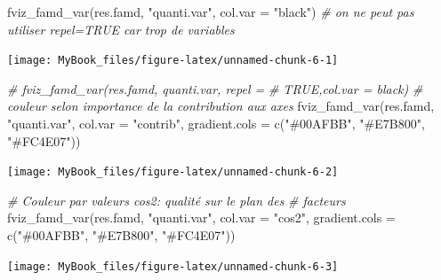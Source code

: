 \documentclass[
  12pt,
  american,
  a4paper,
  extrafontsizes,onecolumn,openright
  ]{memoir}
\newenvironment{Shaded}{\begin{snugshade}}{\end{snugshade}}
\newcommand{\AttributeTok}[1]{\textcolor[rgb]{0.77,0.63,0.00}{#1}}
\newcommand{\CommentTok}[1]{\textcolor[rgb]{0.56,0.35,0.01}{\textit{#1}}}
\newcommand{\FunctionTok}[1]{\textcolor[rgb]{0.00,0.00,0.00}{#1}}
\newcommand{\NormalTok}[1]{#1}
\newcommand{\StringTok}[1]{\textcolor[rgb]{0.31,0.60,0.02}{#1}}
\begin{document}
\begin{Shaded}
\begin{Highlighting}[]
\FunctionTok{fviz\_famd\_var}\NormalTok{(res.famd, }\StringTok{"quanti.var"}\NormalTok{, }\AttributeTok{col.var =} \StringTok{"black"}\NormalTok{)  }\CommentTok{\# on ne peut pas utiliser repel=TRUE car trop de variables}
\end{Highlighting}
\end{Shaded}

\begin{center}\texttt{[image: MyBook\_files/figure-latex/unnamed-chunk-6-1]} \end{center}

\begin{Shaded}
\begin{Highlighting}[]
\CommentTok{\# fviz\_famd\_var(res.famd, \textquotesingle{}quanti.var\textquotesingle{}, repel =}
\CommentTok{\# TRUE,col.var = \textquotesingle{}black\textquotesingle{})}
\CommentTok{\# couleur selon importance de la contribution aux axes}
\FunctionTok{fviz\_famd\_var}\NormalTok{(res.famd, }\StringTok{"quanti.var"}\NormalTok{, }\AttributeTok{col.var =} \StringTok{"contrib"}\NormalTok{, }\AttributeTok{gradient.cols =} \FunctionTok{c}\NormalTok{(}\StringTok{"\#00AFBB"}\NormalTok{,}
    \StringTok{"\#E7B800"}\NormalTok{, }\StringTok{"\#FC4E07"}\NormalTok{))}
\end{Highlighting}
\end{Shaded}

\begin{center}\texttt{[image: MyBook\_files/figure-latex/unnamed-chunk-6-2]} \end{center}

\begin{Shaded}
\begin{Highlighting}[]
\CommentTok{\# Couleur par valeurs cos2: qualité sur le plan des}
\CommentTok{\# facteurs}
\FunctionTok{fviz\_famd\_var}\NormalTok{(res.famd, }\StringTok{"quanti.var"}\NormalTok{, }\AttributeTok{col.var =} \StringTok{"cos2"}\NormalTok{, }\AttributeTok{gradient.cols =} \FunctionTok{c}\NormalTok{(}\StringTok{"\#00AFBB"}\NormalTok{,}
    \StringTok{"\#E7B800"}\NormalTok{, }\StringTok{"\#FC4E07"}\NormalTok{))}
\end{Highlighting}
\end{Shaded}

\begin{center}\texttt{[image: MyBook\_files/figure-latex/unnamed-chunk-6-3]} \end{center}
\end{document}
